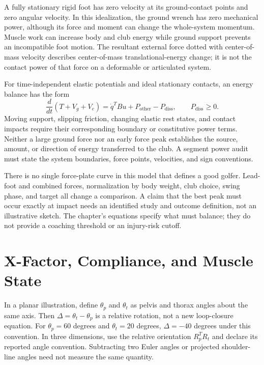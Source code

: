 A fully stationary rigid foot has zero velocity at its ground-contact points
and zero angular velocity. In this idealization, the ground wrench has zero
mechanical power, although its force and moment can change the whole-system
momentum. Muscle work can increase body and club energy while ground support
prevents an incompatible foot motion. The resultant external force dotted with
center-of-mass velocity describes center-of-mass translational-energy change; it is not the
contact power of that force on a deformable or articulated system.

For time-independent elastic potentials and ideal stationary contacts, an
energy balance has the form
\begin{equation}
 \frac{d}{dt}(T+V_g+V_e)
 =\dot q^TBu+P_{\mathrm{other}}-P_{\mathrm{diss}},
 \qquad P_{\mathrm{diss}}\ge0.
 \label{eq:parallel_energy_balance}
\end{equation}
Moving support, slipping friction, changing elastic rest states, and contact
impacts require their corresponding boundary or constitutive power terms.
Neither a large ground force nor an early force peak establishes the source,
amount, or direction of energy transferred to the club. A segment power audit
must state the system boundaries, force points, velocities, and sign conventions.

There is no single force-plate curve in this model that defines a good golfer.
Lead-foot and combined forces, normalization by body weight, club choice, swing
phase, and target all change a comparison. A claim that the best peak must occur
exactly at impact needs an identified study and outcome definition, not an
illustrative sketch. The chapter's equations specify what must balance; they do
not provide a coaching threshold or an injury-risk cutoff.

\section{X-Factor, Compliance, and Muscle State}
\label{sec:body_as_closed_chain}

In a planar illustration, define $\theta_p$ and $\theta_t$ as pelvis and thorax
angles about the same axis. Then $\Delta=\theta_t-\theta_p$ is a relative
rotation, not a new loop-closure equation. For $\theta_p=60$ degrees and
$\theta_t=20$ degrees, $\Delta=-40$ degrees under this convention. In three
dimensions, use the relative orientation $R_p^TR_t$ and declare its reported
angle convention. Subtracting two Euler angles or projected shoulder-line
angles need not measure the same quantity.

